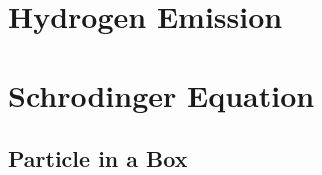 \documentclass[11pt]{article}
\newcommand{\pic}[2]{\texttt{[image: \#2]}}
\begin{document}
\section{Hydrogen Emission}
%  
%
%        
%
%  
%
%
%
%
%  
%
%  
%
%
%
%
%
\section{Schrodinger Equation}


\subsection{Particle in a Box}
\end{document}
